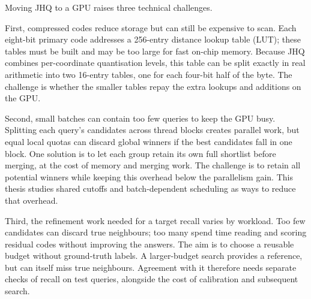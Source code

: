 Moving JHQ to a GPU raises three technical challenges.

First, compressed codes reduce storage but can still be expensive to scan.
Each eight-bit primary code addresses a 256-entry distance lookup table
(LUT); these tables must be built and may be too large for fast on-chip memory.
Because JHQ combines per-coordinate quantisation levels, this table can
be split exactly in real arithmetic into two 16-entry tables, one for
each four-bit half of the byte. The challenge is whether the smaller
tables repay the extra lookups and additions on the GPU.

Second, small batches can contain too few queries to keep the GPU busy.
Splitting each query's candidates across thread blocks creates parallel
work, but equal local quotas can discard global winners if the best
candidates fall in one block. One solution is to let each group retain
its own full shortlist before merging, at the cost of memory and merging
work. The challenge
is to retain all potential winners while keeping this overhead below
the parallelism gain. This thesis studies shared cutoffs and batch-dependent
scheduling as ways to reduce that overhead.

Third, the refinement work needed for a target recall varies by workload.
Too few candidates can discard true neighbours; too many spend time
reading and scoring residual codes without improving the answers.
The aim is to choose a reusable budget without ground-truth labels.
A larger-budget search provides a reference, but can itself miss true
neighbours. Agreement with it therefore needs separate checks of recall
on test queries, alongside the cost of calibration and subsequent search.

